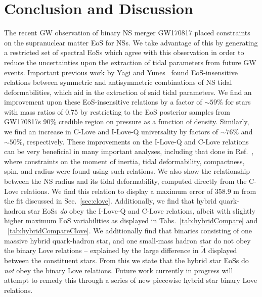 \documentclass[prd,twocolumn,nofootinbib,superscriptaddress,amsmath,amssymb]{revtex4-1}
\begin{document}
\section{Conclusion and Discussion}\label{sec:conclusion}
The recent GW observation of binary NS merger GW170817 placed constraints on the supranuclear matter EoS for NSs.
We take advantage of this by generating a restricted set of spectral EoSs which agree with this observation in order to reduce the uncertainties upon the extraction of tidal parameters from future GW events.
Important previous work by Yagi and Yunes~\cite{Yagi:ILQ,Yagi:binLove} found EoS-insensitive relations between symmetric and antisymmetric combinations of NS tidal deformabilities, which aid in the extraction of said tidal parameters.
We find an improvement upon these EoS-insensitive relations by a factor of $\sim 59$\% for stars with mass ratios of $0.75$ by restricting to the EoS posterior samples from GW170817s 90\% credible region on pressure as a function of density.
Similarly, we find an increase in C-Love and I-Love-Q universality by factors of $\sim 76$\% and $\sim 50$\%, respectively.
These improvements on the I-Love-Q and C-Love relations can be very beneficial in many important analyses, including that done in Ref.~\cite{Kumar:2019xgp}, where constraints on the moment of inertia, tidal deformability, compactness, spin, and radius were found using such relations.
We also show the relationship between the NS radius and its tidal deformability, computed directly from the C-Love relations.
We find this relation to display a maximum error of $358.9\text{ m}$ from the fit discussed in Sec.~\ref{sec:clove}.
Additionally, we find that hybrid quark-hadron star EoSs \emph{do} obey the I-Love-Q and C-Love relations, albeit with slightly higher maximum EoS variabilities as displayed in Tabs.~\ref{tab:hybridCompare} and ~\ref{tab:hybridCompareClove}.
We additionally find that binaries consisting of one massive hybrid quark-hadron star, and one small-mass hadron star do not obey the binary Love relations -- explained by the large difference in $\tilde{\Lambda}$ displayed between the constituent stars.
From this we state that the hybrid star EoSs do \emph{not} obey the binary Love relations.
Future work currently in progress will attempt to remedy this through a series of new piecewise hybrid star binary Love relations.
\end{document}
